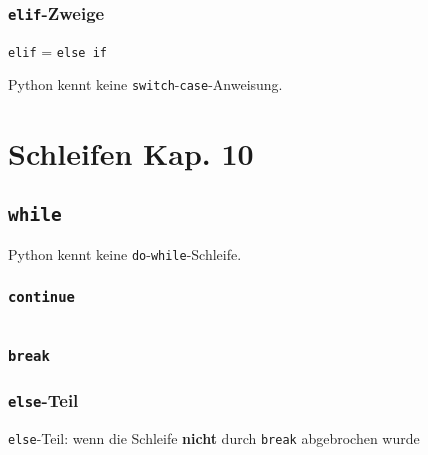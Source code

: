 \subsubsection{\texttt{elif}-Zweige}

\texttt{elif} = \texttt{else if}\\

\begin{achtung}
	Python kennt keine \texttt{switch}-\texttt{case}-Anweisung.
\end{achtung}

\section[Schleifen]{Schleifen \tiny{Kap. 10}}
\subsection{\texttt{while}}


\begin{achtung}
	Python kennt keine \texttt{do}-\texttt{while}-Schleife.
\end{achtung}

\begin{minipage}[t]{0.49\textwidth}
\subsubsection{\texttt{continue}}

\end{minipage}
\begin{minipage}[t]{0.02\textwidth} $ \quad $\end{minipage}
\begin{minipage}[t]{0.49\textwidth}
\subsubsection{\texttt{break}}

\end{minipage}

\subsubsection{\texttt{else}-Teil}

\texttt{else}-Teil: wenn die Schleife \textbf{nicht} durch \texttt{break} abgebrochen wurde

